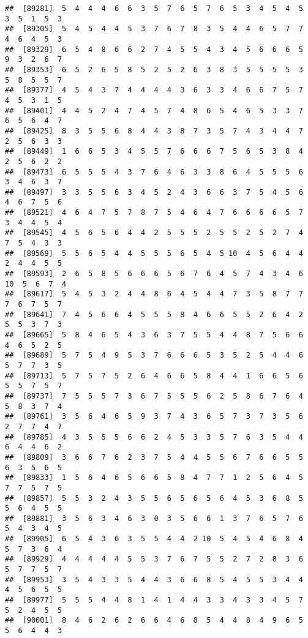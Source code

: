 \documentclass[
]{book}
\begin{document}
\begin{verbatim}
##  [89281]  5  4  4  4  6  6  3  5  7  6  5  7  6  5  3  4  5  4  5  3  5  1  5  3
##  [89305]  5  4  5  4  4  5  3  7  6  7  8  3  5  4  4  6  5  7  7  4  6  4  5  3
##  [89329]  6  5  4  8  6  6  2  7  4  5  5  4  3  4  5  6  6  6  5  9  3  2  6  7
##  [89353]  6  5  2  6  5  8  5  2  5  2  6  3  8  3  5  5  5  5  3  5  8  5  5  7
##  [89377]  4  5  4  3  7  4  4  4  4  3  6  3  3  4  6  6  7  5  7  4  5  3  1  5
##  [89401]  4  4  5  2  4  7  4  5  7  4  8  6  5  4  6  5  3  3  7  6  5  6  4  7
##  [89425]  8  3  5  5  6  8  4  4  3  8  7  3  5  7  4  3  4  4  7  2  5  6  3  3
##  [89449]  1  6  6  5  3  4  5  5  7  6  6  6  7  5  6  5  3  8  4  2  5  6  2  2
##  [89473]  6  5  5  5  4  3  7  6  4  6  3  3  8  6  4  5  5  5  6  3  4  6  3  7
##  [89497]  3  3  5  5  6  3  4  5  2  4  3  6  6  3  7  5  4  5  6  4  6  7  5  6
##  [89521]  4  6  4  7  5  7  8  7  5  4  6  4  7  6  6  6  6  5  7  3  4  4  5  4
##  [89545]  4  5  6  5  6  4  4  2  5  5  5  2  5  5  2  5  2  7  4  7  5  4  3  3
##  [89569]  5  5  6  5  4  4  5  5  5  6  5  4  5 10  4  5  6  4  4  2  4  4  5  5
##  [89593]  2  6  5  8  5  6  6  6  5  6  7  6  4  5  7  4  3  4  6 10  5  6  7  4
##  [89617]  5  4  5  3  2  4  4  8  6  4  5  4  4  7  3  5  8  7  7  7  6  7  5  7
##  [89641]  7  4  5  6  6  4  5  5  5  8  4  6  6  5  5  2  6  4  2  5  5  3  7  3
##  [89665]  5  8  4  6  5  4  3  6  3  7  5  5  4  4  8  7  5  6  6  4  6  5  2  5
##  [89689]  5  7  5  4  9  5  3  7  6  6  6  5  3  5  2  5  4  4  6  5  7  7  3  5
##  [89713]  5  7  5  7  5  2  6  4  6  6  5  8  4  4  1  6  6  5  6  5  5  7  5  7
##  [89737]  7  5  5  5  7  3  6  7  5  5  5  6  2  5  8  6  7  6  4  5  8  3  7  4
##  [89761]  3  5  6  4  6  5  9  3  7  4  3  6  5  7  3  7  3  5  6  2  7  7  4  7
##  [89785]  4  3  5  5  5  6  6  2  4  5  3  3  5  7  6  3  5  4  4  6  4  4  6  2
##  [89809]  3  6  6  7  6  2  3  7  5  4  4  5  5  6  7  6  6  5  5  6  3  5  6  5
##  [89833]  1  5  6  4  6  5  6  6  5  8  4  7  7  1  2  5  6  4  5  7  7  5  7  5
##  [89857]  5  5  3  2  4  3  5  5  6  5  6  5  6  4  5  3  6  8  5  5  6  4  5  5
##  [89881]  3  5  6  3  4  6  3  0  3  5  6  6  1  3  7  6  5  7  6  5  4  3  4  5
##  [89905]  6  5  4  3  6  3  5  5  4  4  2 10  5  4  5  4  6  8  4  5  7  3  6  4
##  [89929]  4  4  4  4  4  5  5  3  7  6  7  5  5  2  7  2  8  3  6  5  7  7  5  7
##  [89953]  3  5  4  3  3  5  4  4  3  6  6  8  5  4  5  5  3  4  4  4  5  6  5  5
##  [89977]  5  5  5  4  4  8  1  4  1  4  4  3  3  4  3  3  4  5  7  5  2  4  5  5
##  [90001]  8  4  6  2  6  2  6  6  4  6  8  5  4  4  8  4  9  6  5  5  6  4  4  3

\end{verbatim}
\end{document}
